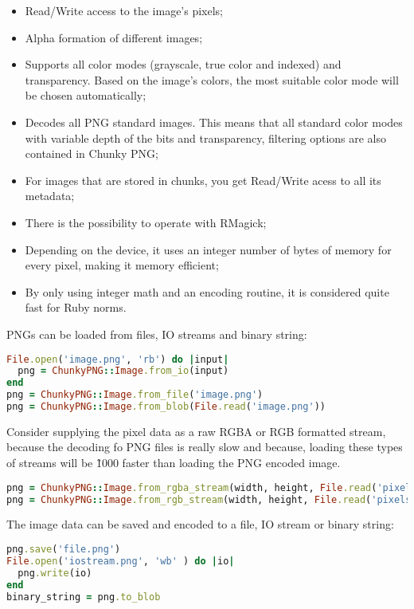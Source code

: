 \begin{itemize}
  \item Read/Write access to the image’s pixels;
  \item Alpha formation of different images;
  \item Supports all color modes (grayscale, true color and indexed) and transparency. Based on the image’s colors, the most suitable color mode will be chosen automatically;
  \item Decodes all PNG standard images. This means that all standard color modes with variable depth of the bits and transparency, filtering options are also contained in Chunky PNG;
  \item For images that are stored in chunks, you get Read/Write acess to all its metadata;
  \item There is the possibility to operate with RMagick;
  \item Depending on the device, it uses an integer number of bytes of memory for every pixel, making it memory efficient;
  \item By only using integer math and an encoding routine, it is considered quite fast for Ruby norms. 
\end{itemize}

PNGs can be loaded from files, IO streams and binary string:

\begin{lstlisting}[language=Ruby, caption={Loading PNGs with Chunky PNG}, label=chunky_png1]
File.open('image.png', 'rb') do |input| 
  png = ChunkyPNG::Image.from_io(input)
end
png = ChunkyPNG::Image.from_file('image.png')
png = ChunkyPNG::Image.from_blob(File.read('image.png'))
\end{lstlisting}

Consider supplying the pixel data as a raw RGBA or RGB formatted stream, because the decoding fo PNG files is really slow and because, loading these types of streams will be \~1000 faster than loading the PNG encoded image.

\begin{lstlisting}[language=Ruby, caption={Loading pixel stream with Chunky PNG}, label=chunky_png2]
png = ChunkyPNG::Image.from_rgba_stream(width, height, File.read('pixels.rgba'))
png = ChunkyPNG::Image.from_rgb_stream(width, height, File.read('pixels.rgb'))
\end{lstlisting}

The image data can be saved and encoded to a file, IO stream or binary string:
\begin{lstlisting}[language=Ruby, caption={Loading pixel stream with Chunky PNG}, label=chunky_png3]
png.save('file.png')
File.open('iostream.png', 'wb' ) do |io| 
  png.write(io)
end
binary_string = png.to_blob
\end{lstlisting}

